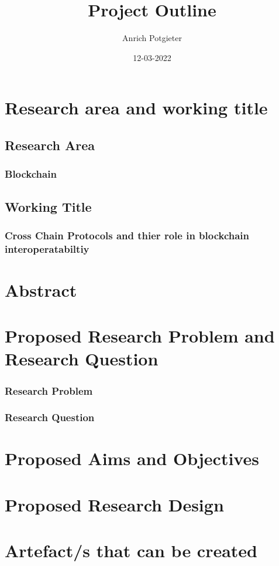 \documentclass[12pt]{article}
\title{Project Outline}
\author{Anrich Potgieter}
\date{12-03-2022}
\begin{document}
\maketitle
\tableofcontents

\section{Research area and working title}
\subsection{Research Area}
\subsubsection{Blockchain}

\subsection{Working Title}
\subsubsection{Cross Chain Protocols and thier role in blockchain interoperatabiltiy}

\section{Abstract}

\section{Proposed Research Problem and Research Question}
\subsubsection{Research Problem}
\subsubsection{Research Question}

\section{Proposed Aims and Objectives}
\section{Proposed Research Design}
\section{Artefact/s that can be created}

\printbibliography
\end{document}
